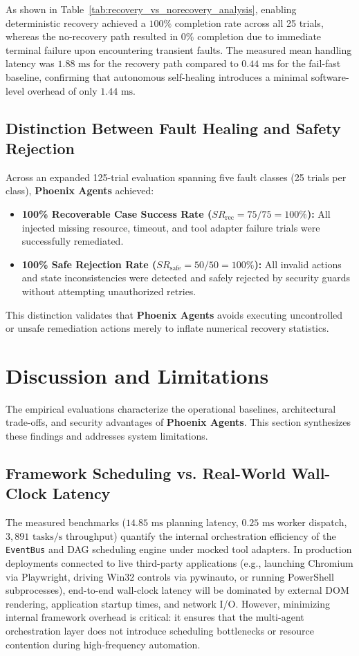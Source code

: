 \documentclass[conference]{IEEEtran}
\begin{document}
As shown in Table~\ref{tab:recovery_vs_norecovery_analysis}, enabling deterministic recovery achieved a $100\%$ completion rate across all 25 trials, whereas the no-recovery path resulted in $0\%$ completion due to immediate terminal failure upon encountering transient faults. The measured mean handling latency was $1.88\text{ ms}$ for the recovery path compared to $0.44\text{ ms}$ for the fail-fast baseline, confirming that autonomous self-healing introduces a minimal software-level overhead of only $1.44\text{ ms}$.

\subsection{Distinction Between Fault Healing and Safety Rejection}
Across an expanded 125-trial evaluation spanning five fault classes (25 trials per class), \textbf{Phoenix Agents} achieved:
\begin{itemize}
    \item \textbf{100\% Recoverable Case Success Rate ($SR_{\text{rec}} = 75/75 = 100\%$):} All injected missing resource, timeout, and tool adapter failure trials were successfully remediated.
    \item \textbf{100\% Safe Rejection Rate ($SR_{\text{safe}} = 50/50 = 100\%$):} All invalid actions and state inconsistencies were detected and safely rejected by security guards without attempting unauthorized retries.
\end{itemize}
This distinction validates that \textbf{Phoenix Agents} avoids executing uncontrolled or unsafe remediation actions merely to inflate numerical recovery statistics.

\section{Discussion and Limitations}
\label{sec:discussion}

The empirical evaluations characterize the operational baselines, architectural trade-offs, and security advantages of \textbf{Phoenix Agents}. This section synthesizes these findings and addresses system limitations.

\subsection{Framework Scheduling vs. Real-World Wall-Clock Latency}
The measured benchmarks ($14.85\text{ ms}$ planning latency, $0.25\text{ ms}$ worker dispatch, $3,891\text{ tasks/s}$ throughput) quantify the internal orchestration efficiency of the \texttt{EventBus} and DAG scheduling engine under mocked tool adapters. In production deployments connected to live third-party applications (e.g., launching Chromium via Playwright, driving Win32 controls via pywinauto, or running PowerShell subprocesses), end-to-end wall-clock latency will be dominated by external DOM rendering, application startup times, and network I/O. However, minimizing internal framework overhead is critical: it ensures that the multi-agent orchestration layer does not introduce scheduling bottlenecks or resource contention during high-frequency automation.
\end{document}
